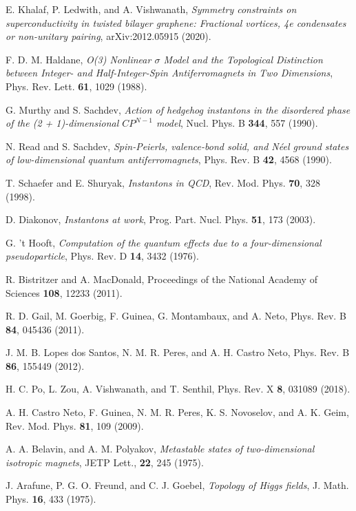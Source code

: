 \documentclass[aps,prb,amsmath,amssymb,floatfix,twocolumn]{revtex4}
\begin{document}
\begin{thebibliography}{}
 E. Khalaf, P. Ledwith, and A. Vishwanath, \emph{Symmetry constraints on superconductivity in twisted bilayer graphene: Fractional vortices, 4e condensates or non-unitary pairing}, arXiv:2012.05915 (2020).

 F. D. M. Haldane, \emph{O(3) Nonlinear $\sigma$ Model and the Topological Distinction between Integer- and Half-Integer-Spin Antiferromagnets in Two Dimensions}, Phys. Rev. Lett. \textbf{61}, 1029 (1988).

 G. Murthy and S. Sachdev, \emph{Action of hedgehog instantons in the disordered phase of the (2 + 1)-dimensional $CP^{N-1}$ model}, Nucl. Phys. B \textbf{344}, 557 (1990).

 N. Read and S. Sachdev, \emph{Spin-Peierls, valence-bond solid, and N\'eel ground states of low-dimensional quantum antiferromagnets}, Phys. Rev. B \textbf{42}, 4568 (1990).

 T. Schaefer and E. Shuryak, \emph{Instantons in QCD}, Rev. Mod. Phys. \textbf{70}, 328 (1998).

 D. Diakonov, \emph{Instantons at work}, Prog. Part. Nucl. Phys. \textbf{51}, 173 (2003). 

 G. 't Hooft, \emph{Computation of the quantum effects due to a four-dimensional pseudoparticle}, Phys. Rev. D \textbf{14}, 3432 (1976).

 R. Bistritzer and A. MacDonald, Proceedings of the National Academy of Sciences \textbf{108}, 12233 (2011).

 R. D. Gail, M. Goerbig, F. Guinea, G. Montambaux, and A. Neto, Phys. Rev. B \textbf{84}, 045436 (2011).

 J. M. B. Lopes dos Santos, N. M. R. Peres, and A. H. Castro Neto, Phys. Rev. B \textbf{86}, 155449 (2012).

 H. C. Po, L. Zou, A. Vishwanath, and T. Senthil, Phys. Rev. X \textbf{8}, 031089 (2018).

 A. H. Castro Neto, F. Guinea, N. M. R. Peres, K. S. Novoselov, and A. K. Geim, Rev. Mod. Phys. \textbf{81}, 109 (2009).

 A. A. Belavin, and A. M. Polyakov, {\it Metastable states of two-dimensional isotropic magnets}, JETP Lett., \textbf{22}, 245 (1975). 

 J. Arafune, P. G. O. Freund, and C. J. Goebel, \emph{Topology of Higgs fields}, J. Math. Phys. \textbf{16}, 433 (1975).


\end{thebibliography}
\end{document}
